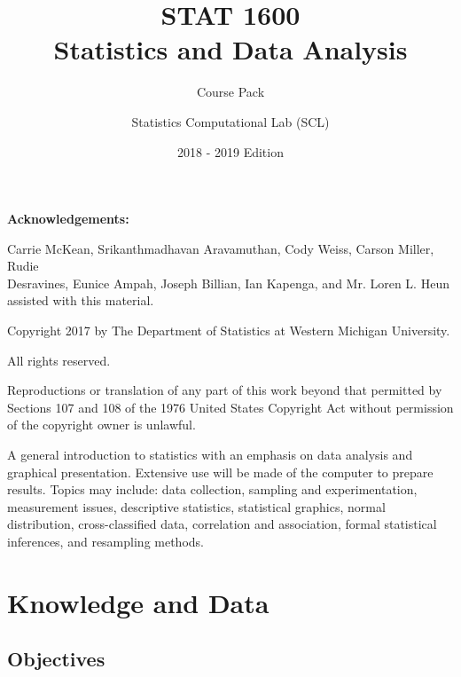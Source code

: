 \documentclass[11pt, chapterprefix=true]{scrbook}\usepackage[]{graphicx}\usepackage[]{color}
\title{{\Huge{STAT 1600 \\ Statistics and Data Analysis }}}
\subtitle{{\huge{Course Pack}}}
\author{Statistics Computational Lab (SCL)}
\date{2018 - 2019 Edition}  %
\begin{document}
\maketitle


\begin{center} \textbf{Acknowledgements:}
\end{center}

Carrie McKean, Srikanthmadhavan Aravamuthan, Cody Weiss, Carson Miller,  Rudie \\ Desravines, Eunice Ampah, Joseph Billian,  Ian Kapenga, and Mr. Loren L. Heun assisted with  this material.

\vspace{11cm}

Copyright 2017 by The Department of Statistics at Western Michigan University.

All rights reserved.

Reproductions or translation of any part of this work beyond that permitted by Sections 107 and 108 of the 1976 United States Copyright Act without permission of the copyright owner is unlawful.

A general introduction to statistics with an emphasis on data analysis and graphical presentation. Extensive use will be made of the computer to prepare results. Topics may include: data collection, sampling and experimentation, measurement issues, descriptive statistics, statistical graphics, normal distribution, cross-classified data, correlation and association, formal statistical inferences, and resampling methods.



\overfullrule=1cm

\tableofcontents





\chapter{Knowledge and Data}
\label{chap:ch1}

\section{Objectives}
\end{document}
